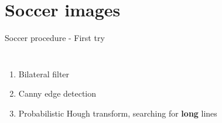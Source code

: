 \documentclass[12pt]{beamer}
\begin{document}
\section{Soccer images}

\begin{frame}{Soccer procedure - First try}
    \begin{columns}
    \begin{enumerate}
        \item<1-> \alert<4>{Bilateral} filter
        \item<2-> Canny edge detection
        \item<3-> Probabilistic Hough transform, searching for \textbf{long} lines
    \end{enumerate}
\end{columns}
\end{frame}
\end{document}
